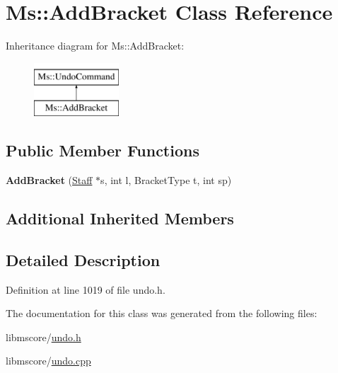 \hypertarget{class_ms_1_1_add_bracket}{}\section{Ms\+:\+:Add\+Bracket Class Reference}
\label{class_ms_1_1_add_bracket}
Inheritance diagram for Ms\+:\+:Add\+Bracket\+:\begin{figure}[H]
\begin{center}
\leavevmode
\includegraphics[height=2.000000cm]{class_ms_1_1_add_bracket}
\end{center}
\end{figure}
\subsection*{Public Member Functions}
\begin{DoxyCompactItemize}
\item 
\mbox{\label{class_ms_1_1_add_bracket_a02bfd1fcc94ee87166427b94a95ced7c}} 
{\bfseries Add\+Bracket} (\hyperlink{class_ms_1_1_staff}{Staff} $\ast$s, int l, Bracket\+Type t, int sp)
\end{DoxyCompactItemize}
\subsection*{Additional Inherited Members}


\subsection{Detailed Description}


Definition at line 1019 of file undo.\+h.



The documentation for this class was generated from the following files\+:\begin{DoxyCompactItemize}
\item 
libmscore/\hyperlink{undo_8h}{undo.\+h}\item 
libmscore/\hyperlink{undo_8cpp}{undo.\+cpp}\end{DoxyCompactItemize}
